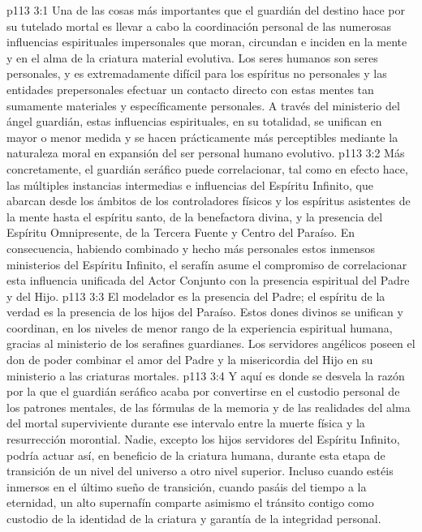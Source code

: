 \vs p113 3:1 Una de las cosas más importantes que el guardián del destino hace por su tutelado mortal es llevar a cabo la coordinación personal de las numerosas influencias espirituales impersonales que moran, circundan e inciden en la mente y en el alma de la criatura material evolutiva. Los seres humanos son seres personales, y es extremadamente difícil para los espíritus no personales y las entidades prepersonales efectuar un contacto directo con estas mentes tan sumamente materiales y específicamente personales. A través del ministerio del ángel guardián, estas influencias espirituales, en su totalidad, se unifican en mayor o menor medida y se hacen prácticamente más perceptibles mediante la naturaleza moral en expansión del ser personal humano evolutivo.
\vs p113 3:2 Más concretamente, el guardián seráfico puede correlacionar, tal como en efecto hace, las múltiples instancias intermedias e influencias del Espíritu Infinito, que abarcan desde los ámbitos de los controladores físicos y los espíritus asistentes de la mente hasta el espíritu santo, de la benefactora divina, y la presencia del Espíritu Omnipresente, de la Tercera Fuente y Centro del Paraíso. En consecuencia, habiendo combinado y hecho más personales estos inmensos ministerios del Espíritu Infinito, el serafín asume el compromiso de correlacionar esta influencia unificada del Actor Conjunto con la presencia espiritual del Padre y del Hijo.
\vs p113 3:3 El modelador es la presencia del Padre; el espíritu de la verdad es la presencia de los hijos del Paraíso. Estos dones divinos se unifican y coordinan, en los niveles de menor rango de la experiencia espiritual humana, gracias al ministerio de los serafines guardianes. Los servidores angélicos poseen el don de poder combinar el amor del Padre y la misericordia del Hijo en su ministerio a las criaturas mortales.
\vs p113 3:4 Y aquí es donde se desvela la razón por la que el guardián seráfico acaba por convertirse en el custodio personal de los patrones mentales, de las fórmulas de la memoria y de las realidades del alma del mortal superviviente durante ese intervalo entre la muerte física y la resurrección morontial. Nadie, excepto los hijos servidores del Espíritu Infinito, podría actuar así, en beneficio de la criatura humana, durante esta etapa de transición de un nivel del universo a otro nivel superior. Incluso cuando estéis inmersos en el último sueño de transición, cuando pasáis del tiempo a la eternidad, un alto supernafín comparte asimismo el tránsito contigo como custodio de la identidad de la criatura y garantía de la integridad personal.

